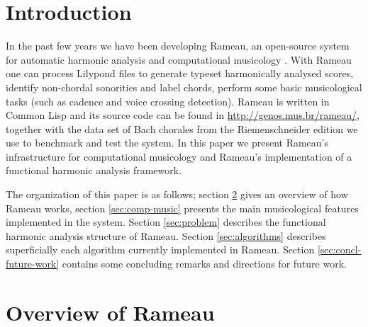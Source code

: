 
\section{Introduction}
\label{sec:introduction}

In the past few years we have been developing Rameau, an open-source
system for automatic harmonic analysis and computational musicology
\cite{kroger08:rameau}. With Rameau one can process Lilypond files to
generate typeset harmonically analysed scores, identify non-chordal
sonorities and label chords, perform some basic musicological tasks
(such as cadence and voice crossing detection). Rameau is written in
Common Lisp and its source code can be found in
\url{http://genos.mus.br/rameau/}, together with the data set of Bach
chorales from the Riemenschneider \cite{bach41:371} edition we use to
benchmark and test the system. In this paper we present Rameau's
infrastructure for computational musicology and Rameau's
implementation of a functional harmonic analysis framework.

The organization of this paper is as follows; section \ref{sec:system}
gives an overview of how Rameau works, section \ref{sec:comp-music}
presents the main musicological features implemented in the
system. Section \ref{sec:problem} describes the functional harmonic
analysis structure of Rameau. Section \ref{sec:algorithms} describes
superficially each algorithm currently implemented in Rameau. Section
\ref{sec:concl-future-work} contains some concluding remarks and
directions for future work.

\section{Overview of Rameau}
\label{sec:system}

